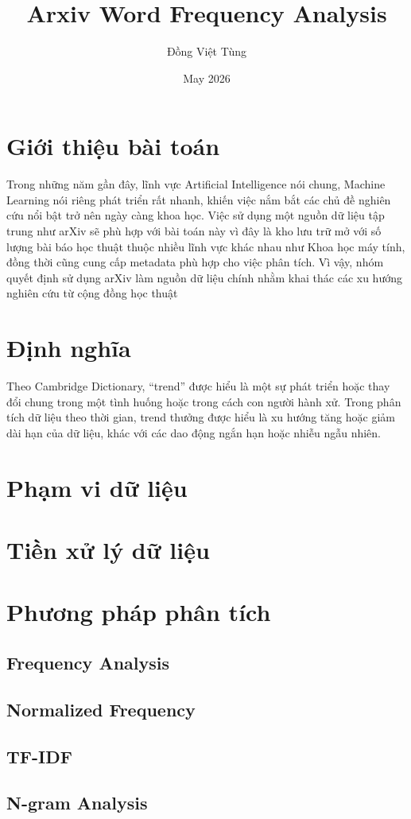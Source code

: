 \documentclass{article}
\title{Arxiv Word Frequency Analysis}
\author{Đồng Việt Tùng}
\date{May 2026}
\begin{document}
\maketitle

\section{Giới thiệu bài toán}
Trong những năm gần đây, lĩnh vực Artificial Intelligence nói chung, Machine Learning nói riêng phát triển rất nhanh, khiến việc nắm bắt các chủ đề nghiên cứu nổi bật trở nên ngày càng khoa học. Việc sử dụng một nguồn dữ liệu tập trung như arXiv sẽ phù hợp với bài toán này vì đây là kho lưu trữ mở với số lượng bài báo học thuật thuộc nhiều lĩnh vực khác nhau như Khoa học máy tính, đồng thời cũng cung cấp metadata phù hợp cho việc phân tích. Vì vậy, nhóm quyết định sử dụng arXiv làm nguồn dữ liệu chính nhằm khai thác các xu hướng nghiên cứu từ cộng đồng học thuật
\section{Định nghĩa}
Theo Cambridge Dictionary, “trend” được hiểu là một sự phát triển hoặc thay đổi chung trong một tình huống hoặc trong cách con người hành xử. Trong phân tích dữ liệu theo thời gian, trend thưởng được hiểu là xu hướng tăng hoặc giảm dài hạn của dữ liệu, khác với các dao động ngắn hạn hoặc nhiễu ngẫu nhiên.
\section{Phạm vi dữ liệu}
\section{Tiền xử lý dữ liệu}
\section{Phương pháp phân tích}
\subsection{Frequency Analysis}
\subsection{Normalized Frequency}
\subsection{TF-IDF}
\subsection{N-gram Analysis}
\end{document}
